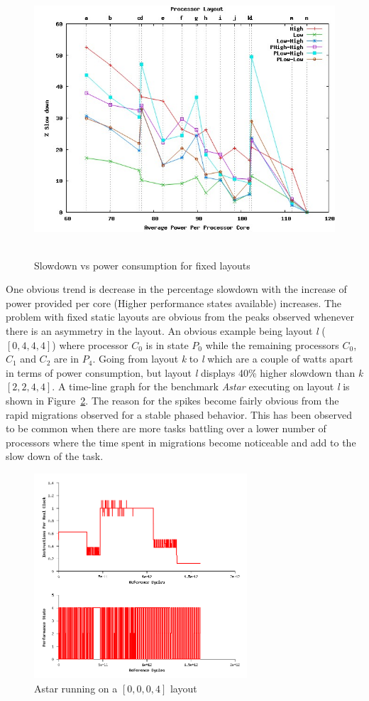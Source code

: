 \begin{figure}[h!]
  \begin{center}
    \includegraphics[height=4in]{figures/fixed_results.jpg}%
    \caption{Slowdown vs power consumption for fixed layouts}
    \label{fig:fixed_res}
  \end{center}
\end{figure}

One obvious trend is decrease in the percentage slowdown with the increase of power provided per 
core (Higher performance states available)
increases. The problem with fixed static layouts are obvious from the peaks observed
whenever there is an asymmetry in the layout. An obvious example being layout \textit{l} ($[0,4,4,4]$) where processor
$C_0$ is in state $P_0$ while the remaining processors $C_0$,$C_1$ and $C_2$ are in
$P_4$. Going from layout \textit{k} to \textit{l} which are a couple of watts apart in terms of power consumption,
but layout \textit{l} displays 40\% higher slowdown than \textit{k} $[2,2,4,4]$. 
A time-line graph for the benchmark \textit{Astar} executing on layout \textit{l} is shown in Figure~\ref{fig:fight_to_death}.
The reason for the spikes become fairly obvious from the rapid migrations observed for
a stable phased behavior. This has been observed to be common when there are more tasks battling
over a lower number of processors where the time spent in migrations
become noticeable and add to the slow down of the task. 

\begin{figure}[h!]
  \begin{center}
    \includegraphics[height=3in]{figures/astar_fight.png}%
    \caption{Astar running on a $[0,0,0,4]$ layout}
    \label{fig:fight_to_death}
  \end{center}
\end{figure}
